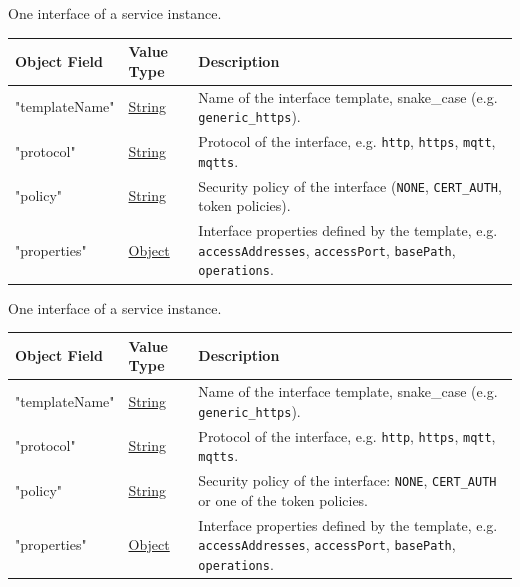 \documentclass[a4paper]{arrowhead}
\newcommand{\pref}[1]{{\textcolor{ArrowheadGrey}{\hyperref[sec:model:primitives:#1]{#1}}}}
\begin{document}

One interface of a service instance.


\noindent\begin{tabularx}{\textwidth}{| >{\raggedright\arraybackslash}p{3.9cm} | >{\raggedright\arraybackslash\small}p{5.3cm} | X |} \hline
\rowcolor{gray!33} Object Field & Value Type & Description \\ \hline
"template\allowbreak{}Name" & \pref{String} & Name of the interface template, snake\_case (e.g. \texttt{generic\_\allowbreak{}https}). \\ \hline
"protocol" & \pref{String} & Protocol of the interface, e.g. \texttt{http}, \texttt{https}, \texttt{mqtt}, \texttt{mqtts}. \\ \hline
"policy" & \pref{String} & Security policy of the interface (\texttt{NONE}, \texttt{CERT\_\allowbreak{}AUTH}, token policies). \\ \hline
"properties" & \pref{Object} & Interface properties defined by the template, e.g. \texttt{accessAddresses}, \texttt{accessPort}, \texttt{basePath}, \texttt{operations}. \\ \hline
\end{tabularx}




One interface of a service instance.


\noindent\begin{tabularx}{\textwidth}{| >{\raggedright\arraybackslash}p{3.9cm} | >{\raggedright\arraybackslash\small}p{5.3cm} | X |} \hline
\rowcolor{gray!33} Object Field & Value Type & Description \\ \hline
"template\allowbreak{}Name" & \pref{String} & Name of the interface template, snake\_case (e.g. \texttt{generic\_\allowbreak{}https}). \\ \hline
"protocol" & \pref{String} & Protocol of the interface, e.g. \texttt{http}, \texttt{https}, \texttt{mqtt}, \texttt{mqtts}. \\ \hline
"policy" & \pref{String} & Security policy of the interface: \texttt{NONE}, \texttt{CERT\_\allowbreak{}AUTH} or one of the token policies. \\ \hline
"properties" & \pref{Object} & Interface properties defined by the template, e.g. \texttt{accessAddresses}, \texttt{accessPort}, \texttt{basePath}, \texttt{operations}. \\ \hline
\end{tabularx}
\end{document}
